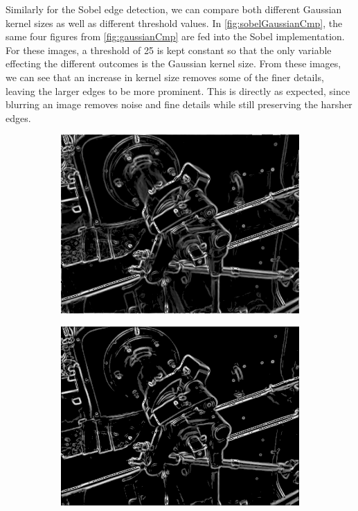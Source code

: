 \documentclass[12pt]{article}
\begin{document}
		Similarly for the Sobel edge detection, we can compare both different Gaussian kernel sizes as well as different threshold values. In \autoref{fig:sobelGaussianCmp}, the same four figures from \autoref{fig:gaussianCmp} are fed into the Sobel implementation. For these images, a threshold of 25 is kept constant so that the only variable effecting the different outcomes is the Gaussian kernel size. From these images, we can see that an increase in kernel size removes some of the finer details, leaving the larger edges to be more prominent. This is directly as expected, since blurring an image removes noise and fine details while still preserving the harsher edges. 

		\begin{figure}[H]
			\centering
			\begin{subfigure}[b]{0.45\linewidth}
				\includegraphics[width=1\linewidth,keepaspectratio]{../examples/valve/valve_gaussian-5x5_thresh-25}
				\subcaption{}
				\label{fig:sobelThreshCmp25}
			\end{subfigure} %
			\begin{subfigure}[b]{0.45\linewidth}
				\includegraphics[width=1\linewidth,keepaspectratio]{../examples/valve/valve_gaussian-5x5_thresh-50}

\end{subfigure}
\end{figure}
\end{document}
